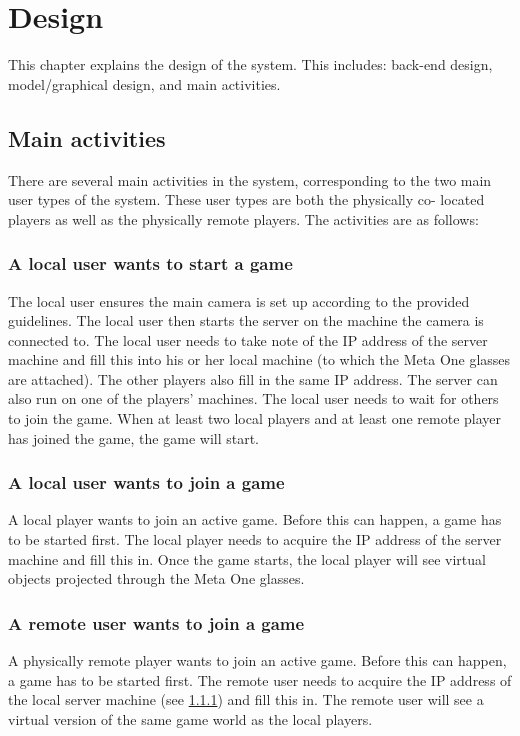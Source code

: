 \chapter{Design} \label{cha:design}
	This chapter explains the design of the system. This includes: back-end
	design, model/graphical design, and main activities.

	\section{Main activities} \label{sec:mainactivities}
		There are several main activities in the system, corresponding to the two
		main user types of the system. These user types are both the physically co-
		located	players as well as the physically remote players. The activities
		are as follows:

		\subsection{A local user wants to start a game} \label{ssec:userstartgame}
			The local user ensures the main camera is set up according to the 
			provided guidelines. The local user then starts the server on the 
			machine the camera is connected to. The local user needs to take note 
			of the IP address of the server machine and fill this into his or her local 
			machine (to which the Meta One glasses are attached). The other players
			also fill in the same IP address. The server can also run on one of the 
			players' machines. The local user needs to wait for others to join the 
			game. When at least two local players and at least one remote player 
			has joined the game, the game will start.
			
		\subsection{A local user wants to join a game} \label{ssec:localjoingame}
			A local player wants to join an active game. Before this can
			happen, a game has to be started first. The local player needs to 
			acquire the IP address of the server machine and fill this in.
			Once the game starts, the local player will see virtual objects projected 
			through the Meta One glasses.

		\subsection{A remote user wants to join a game} \label{ssec:remotejoingame}
			A physically remote player wants to join an active game. Before this can
			happen, a game has to be started first. The remote user needs to acquire 
			the IP address of the local server machine (see \ref{ssec:userstartgame})
			and fill this in. The remote user will see a virtual version of the 
			same game world as the local players.
			
